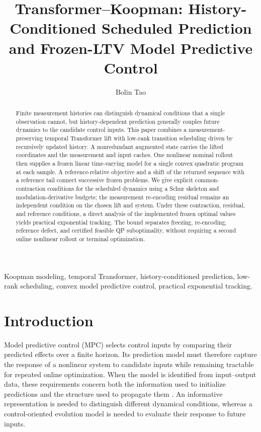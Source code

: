 \documentclass[journal]{IEEEtran}
\begin{document}
\title{Transformer--Koopman: History-Conditioned Scheduled Prediction and Frozen-LTV Model Predictive Control}
\author{Bolin Tao}
\maketitle

\begin{abstract}
Finite measurement histories can distinguish dynamical conditions that a single observation cannot, but history-dependent prediction generally couples future dynamics to the candidate control inputs. This paper combines a measurement-preserving temporal Transformer lift with low-rank transition scheduling driven by recursively updated history. A nonredundant augmented state carries the lifted coordinates and the measurement and input caches. One nonlinear nominal rollout then supplies a frozen linear time-varying model for a single convex quadratic program at each sample. A reference-relative objective and a shift of the returned sequence with a reference tail connect successive frozen problems. We give explicit common-contraction conditions for the scheduled dynamics using a Schur skeleton and modulation-derivative budgets; the measurement re-encoding residual remains an independent condition on the chosen lift and system. Under these contraction, residual, and reference conditions, a direct analysis of the implemented frozen optimal values yields practical exponential tracking. The bound separates freezing, re-encoding, reference defect, and certified feasible QP suboptimality, without requiring a second online nonlinear rollout or terminal optimization.
\end{abstract}
\begin{IEEEkeywords}
Koopman modeling, temporal Transformer, history-conditioned prediction, low-rank scheduling, convex model predictive control, practical exponential tracking.
\end{IEEEkeywords}

\section{Introduction}
\label{sec:introduction}
Model predictive control (MPC) selects control inputs by comparing their predicted effects over a finite horizon. Its prediction model must therefore capture the response of a nonlinear system to candidate inputs while remaining tractable for repeated online optimization. When the model is identified from input--output data, these requirements concern both the information used to initialize predictions and the structure used to propagate them \cite{ljung1999system,nelles2020nonlinear,forgione2021dynonet}. An informative representation is needed to distinguish different dynamical conditions, whereas a control-oriented evolution model is needed to evaluate their response to future inputs.
\end{document}
